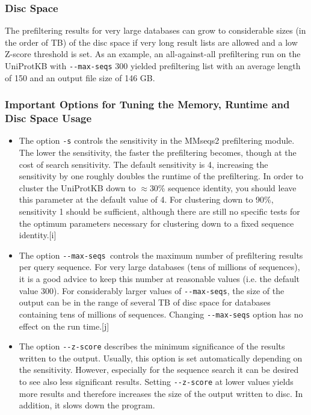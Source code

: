 \documentclass[11pt,a4paper]{scrreprt}
\begin{document}
\subsubsection{Disc Space}
The prefiltering results for very large databases can grow to considerable sizes (in the order of TB) of the disc space if very long result lists are allowed and a low Z-score threshold is set. As an example, an all-against-all prefiltering run on the UniProtKB with \texttt{-{}-max-seqs} 300 yielded prefiltering list with an average length of 150 and an output file size of 146 GB.
\subsubsection{Important Options for Tuning the Memory, Runtime and Disc Space Usage}
\begin{itemize}
\item The option \texttt{-s} controls the sensitivity in the MMseqs2 prefiltering module. The lower the sensitivity, the faster the prefiltering becomes, though at the cost of search sensitivity. The default sensitivity is 4, increasing the sensitivity by one roughly doubles the runtime of the prefiltering. In order to cluster the UniProtKB down to $\approx$30\% sequence identity, you should leave this parameter at the default value of 4. For clustering down to 90\%, sensitivity 1 should be sufficient, although there are still no specific tests for the optimum parameters necessary for clustering down to a fixed sequence identity.[i]
\item The option \texttt{-{}-max-seqs }controls the maximum number of prefiltering results per query sequence. For very large databases (tens of millions of sequences), it is a good advice to keep this number at reasonable values (i.e. the default value 300). For considerably larger values of \texttt{-{}-max-seqs}, the size of the output can be in the range of several TB of disc space for databases containing tens of millions of sequences. Changing \texttt{-{}-max-seqs} option has no effect on the run time.[j]
\item The option \texttt{-{}-z-score} describes the minimum significance of the results written to the output. Usually, this option is set automatically depending on the sensitivity. However, especially for the sequence search it can be desired to see also less significant results. Setting \texttt{-{}-z-score} at lower values yields more results and therefore increases the size of the output written to disc. In addition, it slows down the program.
\end{itemize}
\end{document}
